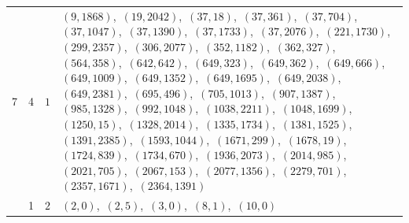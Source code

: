 \documentclass[11pt]{article}
\begin{document}
\begin{longtable}{@{}rrl>{\raggedright\arraybackslash}p{}@{}}
7 & 4 & $1$ & $(9,1868)$,\allowbreak\ $(19,2042)$,\allowbreak\ $(37,18)$,\allowbreak\ $(37,361)$,\allowbreak\ $(37,704)$,\allowbreak\ $(37,1047)$,\allowbreak\ $(37,1390)$,\allowbreak\ $(37,1733)$,\allowbreak\ $(37,2076)$,\allowbreak\ $(221,1730)$,\allowbreak\ $(299,2357)$,\allowbreak\ $(306,2077)$,\allowbreak\ $(352,1182)$,\allowbreak\ $(362,327)$,\allowbreak\ $(564,358)$,\allowbreak\ $(642,642)$,\allowbreak\ $(649,323)$,\allowbreak\ $(649,362)$,\allowbreak\ $(649,666)$,\allowbreak\ $(649,1009)$,\allowbreak\ $(649,1352)$,\allowbreak\ $(649,1695)$,\allowbreak\ $(649,2038)$,\allowbreak\ $(649,2381)$,\allowbreak\ $(695,496)$,\allowbreak\ $(705,1013)$,\allowbreak\ $(907,1387)$,\allowbreak\ $(985,1328)$,\allowbreak\ $(992,1048)$,\allowbreak\ $(1038,2211)$,\allowbreak\ $(1048,1699)$,\allowbreak\ $(1250,15)$,\allowbreak\ $(1328,2014)$,\allowbreak\ $(1335,1734)$,\allowbreak\ $(1381,1525)$,\allowbreak\ $(1391,2385)$,\allowbreak\ $(1593,1044)$,\allowbreak\ $(1671,299)$,\allowbreak\ $(1678,19)$,\allowbreak\ $(1724,839)$,\allowbreak\ $(1734,670)$,\allowbreak\ $(1936,2073)$,\allowbreak\ $(2014,985)$,\allowbreak\ $(2021,705)$,\allowbreak\ $(2067,153)$,\allowbreak\ $(2077,1356)$,\allowbreak\ $(2279,701)$,\allowbreak\ $(2357,1671)$,\allowbreak\ $(2364,1391)$\\
\addlinespace[3pt]
13 & 1 & $2$ & $(2,0)$,\allowbreak\ $(2,5)$,\allowbreak\ $(3,0)$,\allowbreak\ $(8,1)$,\allowbreak\ $(10,0)$\\

\end{longtable}
\end{document}
